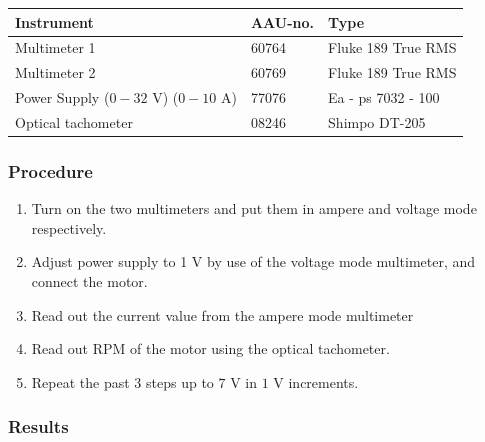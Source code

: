 \begin{table}[H]
\begin{tabular}{|l|l|p{4cm}|}
\hline%
  \textbf{Instrument}                        &  \textbf{AAU-no.}  &  \textbf{Type}       \\
\hline%
  Multimeter 1                               &  60764             &  Fluke 189 True RMS  \\
\hline%
  Multimeter 2                   		         &  60769             &  Fluke 189 True RMS  \\
\hline%
  Power Supply ($0 - 32$ V) ($0 - 10$ A)     &  77076             &  Ea - ps 7032 - 100  \\
\hline%
  Optical tachometer                         &  08246             &  Shimpo DT-205       \\
\hline%
\end{tabular}
\end{table}

\subsubsection{Procedure}

\begin{enumerate}
  \item Turn on the two multimeters and put them in ampere and voltage mode respectively.
  \item Adjust power supply to 1 V by use of the voltage mode multimeter, and connect the motor.
  \item Read out the current value from the ampere mode multimeter
  \item Read out RPM of the motor using the optical tachometer.
  \item Repeat the past $3$ steps up to $7$ V in $1$ V increments.
\end{enumerate}

\subsubsection{Results}

